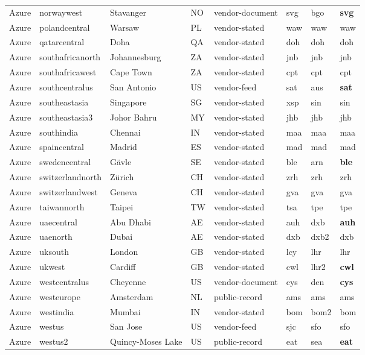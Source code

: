 \begin{longtable}{llllllll}
Azure & norwaywest & Stavanger & NO & vendor-document & svg & bgo & \textbf{svg} \\
Azure & polandcentral & Warsaw & PL & vendor-stated & waw & waw & waw \\
Azure & qatarcentral & Doha & QA & vendor-stated & doh & doh & doh \\
Azure & southafricanorth & Johannesburg & ZA & vendor-stated & jnb & jnb & jnb \\
Azure & southafricawest & Cape Town & ZA & vendor-stated & cpt & cpt & cpt \\
Azure & southcentralus & San Antonio & US & vendor-feed & sat & aus & \textbf{sat} \\
Azure & southeastasia & Singapore & SG & vendor-stated & xsp & sin & sin \\
Azure & southeastasia3 & Johor Bahru & MY & vendor-stated & jhb & jhb & jhb \\
Azure & southindia & Chennai & IN & vendor-stated & maa & maa & maa \\
Azure & spaincentral & Madrid & ES & vendor-stated & mad & mad & mad \\
Azure & swedencentral & Gävle & SE & vendor-stated & ble & arn & \textbf{ble} \\
Azure & switzerlandnorth & Zürich & CH & vendor-stated & zrh & zrh & zrh \\
Azure & switzerlandwest & Geneva & CH & vendor-stated & gva & gva & gva \\
Azure & taiwannorth & Taipei & TW & vendor-stated & tsa & tpe & tpe \\
Azure & uaecentral & Abu Dhabi & AE & vendor-stated & auh & dxb & \textbf{auh} \\
Azure & uaenorth & Dubai & AE & vendor-stated & dxb & dxb2 & dxb \\
Azure & uksouth & London & GB & vendor-stated & lcy & lhr & lhr \\
Azure & ukwest & Cardiff & GB & vendor-stated & cwl & lhr2 & \textbf{cwl} \\
Azure & westcentralus & Cheyenne & US & vendor-document & cys & den & \textbf{cys} \\
Azure & westeurope & Amsterdam & NL & public-record & ams & ams & ams \\
Azure & westindia & Mumbai & IN & vendor-stated & bom & bom2 & bom \\
Azure & westus & San Jose & US & vendor-feed & sjc & sfo & sfo \\
Azure & westus2 & Quincy-Moses Lake & US & public-record & eat & sea & \textbf{eat} \\

\end{longtable}
